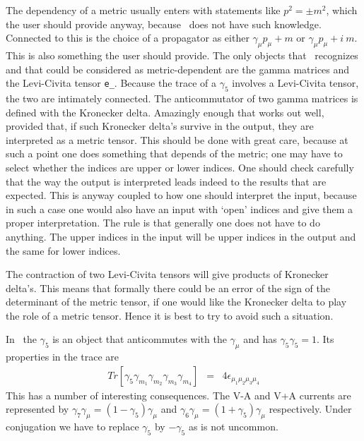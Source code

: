 \noindent The dependency of a metric usually enters with statements like 
$p^2 = \pm m^2$, which the user should provide anyway, because \FORM\ does 
not have such knowledge. Connected to this is the choice of a 
propagator as either $\gamma_\mu p_\mu + m$ or 
$\gamma_\mu p_\mu + i\ m$. This is also something the user should provide. 
The only objects that \FORM\ recognizes and that could be considered as 
metric-dependent are the gamma matrices and the 
Levi-Civita tensor 
\verb:e_:. Because the trace of a $\gamma_5$ involves a Levi-Civita tensor, 
the two are intimately connected. The anticommutator of two gamma matrices 
is defined with the Kronecker delta. Amazingly enough that works out well, 
provided that, if such Kronecker delta's survive in the output, they are 
interpreted as a metric tensor. This should be done with great care, 
because at such a point one does something that depends of the metric; one 
may have to select whether the indices are upper or lower indices. One 
should check carefully that the way the output is interpreted leads indeed 
to the results that are expected. This is anyway coupled to how one should 
interpret the input, because in such a case one would also have an input 
with `open' indices and give them a proper interpretation. The rule is that 
generally one does not have to do anything. The upper indices in the input 
will be upper indices in the output and the same for lower indices. \hfill 
\vspace{2mm}

\noindent The contraction of two Levi-Civita tensors will give products of 
Kronecker delta's. This means that formally there could be an error of the 
sign of the determinant of the metric tensor, if one would like the 
Kronecker delta to play the role of a metric tensor. Hence it is best to 
try to avoid such a situation. \hfill \vspace{2mm}

\noindent In \FORM\ the $\gamma_5$ is an object that anticommutes with 
the $\gamma_\mu$ and has $\gamma_5\gamma_5 = 1$. Its properties 
in the trace are 
\begin{eqnarray}
	Tr[\gamma_5\gamma_{m_1}\gamma_{m_2}\gamma_{m_3}\gamma_{m_4}] & = &
		4 \epsilon_{\mu_1\mu_2\mu_3\mu_4} \nonumber
\end{eqnarray}
This has a number of interesting consequences. The V-A and V+A currents are 
represented by $\gamma_7\gamma_\mu = (1-\gamma_5)\gamma_\mu$ and 
$\gamma_6\gamma_\mu = (1+\gamma_5)\gamma_\mu$ respectively. Under 
conjugation we have to replace $\gamma_5$ by $-\gamma_5$ as is not 
uncommon. \hfill \vspace{2mm}

